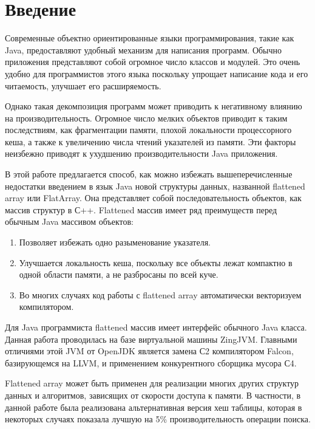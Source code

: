 \section{Введение}
Современные объектно ориентированные языки программирования, такие как Java, предоставляют удобный механизм для написания программ. Обычно приложения представляют собой огромное число классов и модулей. Это очень удобно для программистов этого языка поскольку упрощает написание кода и его читаемость, улучшает его расширяемость.
\par
Однако такая декомпозиция программ может приводить к негативному влиянию на производительность. Огромное число мелких объектов приводит к таким последствиям, как фрагментации памяти, плохой локальности процессорного кеша, а также к увеличению числа чтений указателей из памяти. Эти факторы неизбежно приводят к ухудшению производительности Java приложения.
\par
В этой работе предлагается способ, как можно избежать вышеперечисленные недостатки введением в язык Java новой структуры данных, названной flattened array или FlatArray. Она представляет собой последовательность объектов, как массив структур в С++. Flattened массив имеет ряд преимуществ перед обычным Java массивом объектов:

\begin{enumerate}[align=left]
	\item Позволяет избежать одно разыменование указателя.
	\item Улучшается локальность кеша, поскольку все объекты лежат компактно в одной области памяти, а не разбросаны по всей куче.
	\item Во многих случаях код работы с flattened array автоматически векторизуем компилятором. 
\end{enumerate}

Для Java программиста flattened массив имеет интерфейс обычного Java класса. Данная работа проводилась на базе виртуальной машины ZingJVM. Главными отличиями этой JVM от OpenJDK является замена С2 компилятором Falcon, базирующемся на LLVM, и применением конкурентного сборщика мусора С4\cite{C4collector}.
\par
Flattened array может быть применен для реализации многих других структур данных и алгоритмов, зависящих от скорости доступа к памяти. В частности, в данной работе была реализована альтернативная версия хеш таблицы, которая в некоторых случаях показала лучшую на 5\% производительность операции поиска.

